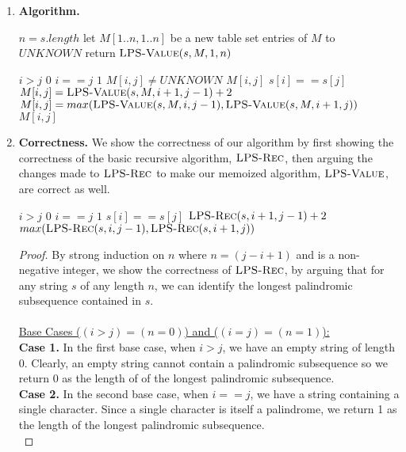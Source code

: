 \documentclass[11pt]{article}
\theoremstyle{nonumberplain}
\newtheorem{proof}{Proof}
\begin{document}
\begin{enumerate}
\item \textbf{Algorithm.} %
  \begin{codebox}
  \li $n=s.length$
  \li let $M[1..n,1..n]$ be a new table
  \li set entries of $M$ to $UNKNOWN$
  \li return $\textnormal{\scshape LPS-Value}(s,M,1,n)$
  \end{codebox}
  \begin{codebox}
  \li \If $i>j$ \Do
  \li   \Return $0$
      \End    
  \li \If $i==j$ \Do
  \li   \Return $1$
      \End
  \li \If $M[i,j] \neq UNKNOWN$ \Do
  \li   \Return $M[i,j]$
      \End
  \li \If $s[i]==s[j]$ \Do
  \li   $M[i,j]=\textnormal{\scshape LPS-Value}(s,M,i+1,j-1)+2$
  \li \Else
  \li   $M[i,j]=max(\textnormal{\scshape LPS-Value}(s,M,i,j-1),\textnormal{\scshape LPS-Value}(s,M,i+1,j))$
      \End
  \li \Return $M[i,j]$
  \end{codebox}
\item \textbf{Correctness.} %
We show the correctness of our algorithm by first showing the correctness of the basic recursive algorithm, $\textnormal{\scshape LPS-Rec}$, then arguing the changes made to $\textnormal{\scshape LPS-Rec}$ to make our memoized algorithm, $\textnormal{\scshape LPS-Value}$, are correct as well.
\begin{codebox}
  \li \If $i>j$ \Do
  \li   \Return $0$
      \End    
  \li \If $i==j$ \Do
  \li   \Return $1$
      \End
  \li \If $s[i]==s[j]$ \Do
  \li   \Return $\textnormal{\scshape LPS-Rec}(s,i+1,j-1)+2$
  \li \Else
  \li   \Return $max(\textnormal{\scshape LPS-Rec}(s,i,j-1),\textnormal{\scshape LPS-Rec}(s,i+1,j))$
      \End
\end{codebox}
\begin{proof}
  By strong induction on $n$ where $n=(j-i+1)$ and is a non-negative integer, we show the correctness of $\textnormal{\scshape LPS-Rec}$, by arguing that for any string $s$ of any length $n$, we can identify the longest palindromic subsequence contained in $s$.\\
  \\
  \ul{Base Cases ($(i>j)=(n=0)$) and ($(i=j)=(n=1)$):}\\
  \textbf{Case 1.} In the first base case, when $i>j$, we have an empty string of length 0. Clearly, an empty string cannot contain a palindromic subsequence so we return 0 as the length of of the longest palindromic subsequence.\\
  \textbf{Case 2.} In the second base case, when $i==j$, we have a string containing a single character. Since a single character is itself a palindrome, we return 1 as the length of the longest palindromic subsequence.\\

\end{proof}
\end{enumerate}
\end{document}
